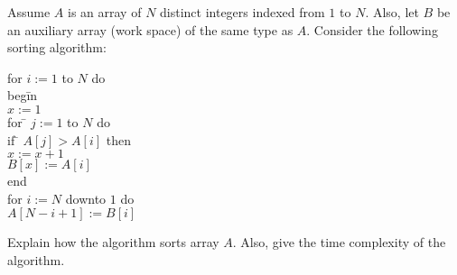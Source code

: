 Assume $A$ is an array of $N$ distinct integers indexed from $1$ to
$N$.  Also, let $B$ be an auxiliary array (work space) of the same type
as $A$.  Consider the following sorting algorithm:

\begin{tt}
\begin{tabbing}
for $i:=1$ to $N$ do \\
beg\=in  \\
      \>  $x:=1$ \\
      \>  for \=  $j:=1$ to $N$ do \\
      \>        \>  if \=  $A[j]>A[i]$ then \\
      \>        \>        \>  $x:=x+1$ \\
      \>  $B[x]:=A[i]$ \\
end \\
for $i:=N$ downto $1$ do \\
      \>  $A[N-i+1]:=B[i]$
\end{tabbing}
\end{tt}

Explain how the algorithm sorts array $A$.  Also, give the time
complexity of the algorithm.
